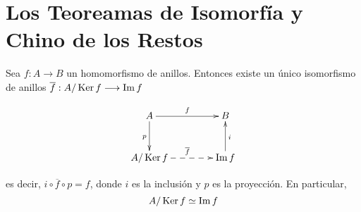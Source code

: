 \section{ Los Teoreamas de Isomorfía y Chino de los Restos}

\begin{teo}
    Sea $f:A\longrightarrow B$ un homomorfismo de anillos. Entonces existe un único isomorfismo de anillos $\overline{f}: A/\operatorname{\rm Ker} f\longrightarrow \operatorname{\rm Im} f$

    $$\xymatrix@C=1.5cm@R=1cm{ 
        A \ar[r]^f\ar[d]_p                     & B \\ 
        A/\Ker f \ar@{-->}[r]^{\overline{f}}  & \Im f\ar[u]_i 
    }$$
    
    es decir, $i\circ \overline{f} \circ p=f$, donde $i$ es la inclusión y $p$ es la proyección. En particular,
    $$ A/\operatorname{\rm Ker} f\simeq \operatorname{\rm Im} f$$
\end{teo}